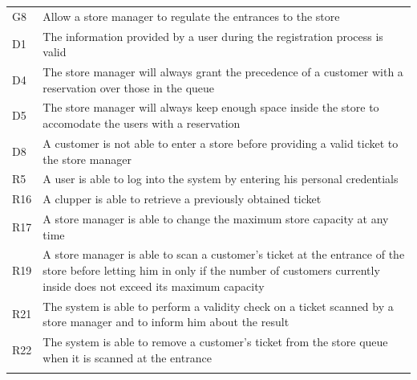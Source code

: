 \documentclass[
]{article}
\begin{document}
\begin{longtable}[]{@{}
  >{\raggedright\arraybackslash}p{}
  >{\raggedright\arraybackslash}p{}@{}}
\toprule
G8 & Allow a store manager to regulate the entrances to the
store \\ \addlinespace
\midrule
\endhead
D1 & The information provided by a user during the registration process
is valid \\ \addlinespace
D4 & The store manager will always grant the precedence of a customer
with a reservation over those in the queue \\ \addlinespace
D5 & The store manager will always keep enough space inside the store to
accomodate the users with a reservation \\ \addlinespace
D8 & A customer is not able to enter a store before providing a valid
ticket to the store manager \\ \addlinespace
R5 & A user is able to log into the system by entering his personal
credentials \\ \addlinespace
R16 & A clupper is able to retrieve a previously obtained
ticket \\ \addlinespace
R17 & A store manager is able to change the maximum store capacity at
any time \\ \addlinespace
R19 & A store manager is able to scan a customer's ticket at the
entrance of the store before letting him in only if the number of
customers currently inside does not exceed its maximum
capacity \\ \addlinespace
R21 & The system is able to perform a validity check on a ticket scanned
by a store manager and to inform him about the result \\ \addlinespace
R22 & The system is able to remove a customer's ticket from the store
queue when it is scanned at the entrance \\ \addlinespace
\bottomrule
\end{longtable}
\end{document}
